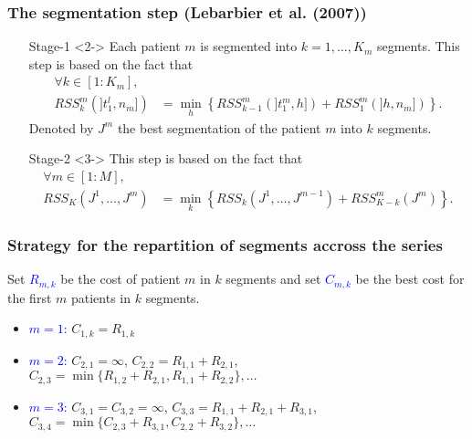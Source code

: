 \documentclass[compress]{beamer}
\begin{document}
\begin{frame}
\frametitle{The segmentation step (Lebarbier et al. (2007))}

\begin{itemize}
\item[Stage-1]<2-> Each patient $m$ is segmented into $k=1,\ldots,K_m$
segments. This step is based on the fact that
\begin{eqnarray*}
\forall k \in [1:K_m], & \\
RSS_{k}^m(]t_{1}^l,n_m]) & = \min_{h}
\left\{RSS_{k-1}^m(]t_{1}^m,h])+RSS_{1}^m(]h,n_m]) \right\}.
\end{eqnarray*}
Denoted by $J^m$ the best segmentation of the patient $m$ into $k$
segments. \\

\item[Stage-2]<3-> This step is based on the fact that
\begin{eqnarray*}
\forall m \in [1:M], &\\
RSS_{K}(J^1,\hdots,J^m) &= \min_{k}
\left\{RSS_{k}(J^1,\hdots,J^{m-1})+RSS_{K-k}^m(J^m) \right\}.
\end{eqnarray*}
\end{itemize}
\end{frame}


\begin{frame}
\frametitle{Strategy for the repartition of segments accross the series}
Set \textcolor{blue}{$R_{m,k}$} be the cost of patient $m$ in $k$ segments and set \textcolor{blue}{$C_{m,k}$} be the best cost for the first $m$ patients in $k$ segments.
\begin{itemize}
\item <2->\textcolor{blue}{ $m=1$:} $C_{1,k}=R_{1,k}$
\item <3-> \textcolor{blue}{$m=2$:} $C_{2,1}=\infty$, $C_{2,2}=R_{1,1}+R_{2,1}$, $C_{2,3}=\min\{R_{1,2}+R_{2,1},R_{1,1}+R_{2,2}\},\ldots$
\item <4-> \textcolor{blue}{$m=3$:} $C_{3,1}=C_{3,2}=\infty$, $C_{3,3}=R_{1,1}+R_{2,1}+R_{3,1}$, $C_{3,4}=\min\{C_{2,3}+R_{3,1},C_{2,2}+R_{3,2}\},\ldots$   
\end{itemize}

\end{frame}
\end{document}
